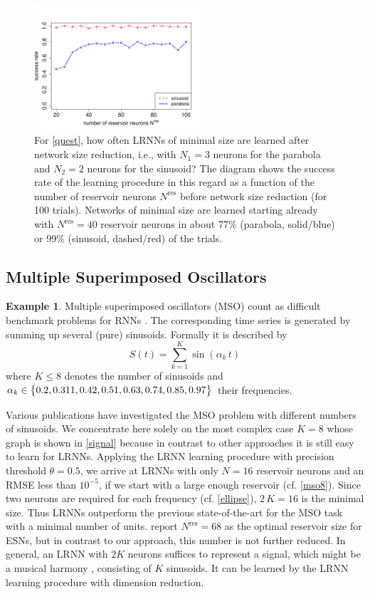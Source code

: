 \documentclass[twoside,11pt]{article}
\theoremstyle{definition}
\newtheorem{exmp}{Example}
\begin{document}
\begin{figure}
	\centering
	\includegraphics[width=0.55\textwidth]{fig/accuracy}
	\caption{For \cref{quest}, how often LRNNs of minimal size are
	learned after network size reduction, i.e., with $N_1 = 3$ neurons for
	the parabola and $N_2 = 2$ neurons for the sinusoid? The diagram shows
	the success rate of the learning procedure in this regard as a function
	of the number of reservoir neurons $N^\mathrm{res}$ before network size
	reduction (for 100 trials). Networks of minimal size are learned
	starting already with $N^\mathrm{res} = 40$ reservoir neurons in about
	77\% (parabola, solid/blue) or 99\% (sinusoid, dashed/red) of the
	trials.}
        \label{dimens}
\end{figure}

\subsection{Multiple Superimposed Oscillators}\label{mso}

\begin{exmp}
Multiple superimposed oscillators (MSO) count as difficult benchmark problems
for RNNs \citep{KLB12,SW+07}. The corresponding time
series is generated by summing up several (pure) sinusoids. Formally
it is described by
	\[ S(t) = \sum\limits_{k=1}^K \sin(\alpha_k\,t) \]
where $K \le 8$ denotes the number of sinusoids and $\alpha_k \in \big\{ 0.2,
0.311, 0.42, 0.51, 0.63, 0.74,\linebreak 0.85, 0.97 \big\}$ their frequencies.
\end{exmp}

Various publications have investigated the MSO problem with different numbers of
sinusoids. We concentrate here solely on the most complex case $K=8$ whose graph
is shown in \cref{signal} because in contrast to other approaches it is still
easy to learn for LRNNs.
Applying the LRNN learning procedure with precision threshold $\theta = 0.5$,
we arrive at LRNNs with only $N=16$ reservoir neurons and an RMSE less than
$10^{-5}$, if we start with a large enough reservoir (cf. \cref{mso8}). Since
two neurons are required for each frequency (cf. \cref{ellipse}), $2\,K=16$ is
the minimal size. Thus LRNNs outperform the previous state-of-the-art for the
MSO task with a minimal number of units. \citet{KLB12} report $N^\mathrm{res} =
68$ as the optimal reservoir size for ESNs, but in contrast to our approach,
this number is not further reduced. In general, an LRNN with $2K$
neurons suffices to represent a signal, which might be a musical harmony
\citep{Sto17b}, consisting of $K$ sinusoids. It can be learned by the
LRNN learning procedure with dimension reduction.
\end{document}
